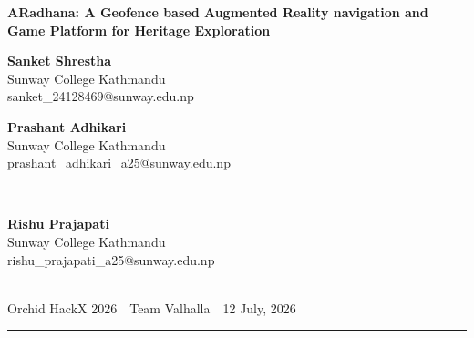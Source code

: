 \documentclass[11pt,a4paper]{report}
\newcommand{\projectname}{ARadhana}
\begin{document}
\thispagestyle{plain} %
\begin{center}
  {\sffamily\LARGE\bfseries\color{orchidnavy}%
    \projectname: A Geofence based Augmented Reality navigation
    and Game Platform for Heritage Exploration\par}
  \vspace{10pt}

  \parbox[t]{0.45\textwidth}{\centering
    \textbf{Sanket Shrestha}\\
    {\small Sunway College Kathmandu}\\
    {\small sanket\_24128469@sunway.edu.np}}%
  \parbox[t]{0.45\textwidth}{\centering
    \textbf{Prashant Adhikari}\\
    {\small Sunway College Kathmandu}\\
    {\small prashant\_adhikari\_a25@sunway.edu.np}}\\[10pt]
  \parbox[t]{0.45\textwidth}{\centering
    \textbf{Rishu Prajapati}\\
    {\small Sunway College Kathmandu}\\
    {\small rishu\_prajapati\_a25@sunway.edu.np}}\\[10pt]

  {\small\color{inkmuted}Orchid HackX 2026 \,\textperiodcentered\, Team Valhalla \,\textperiodcentered\, 12 July, 2026}\\[4pt]
  {\color{orchidcrimson}\rule{0.6\textwidth}{0.8pt}}
\end{center}

\vspace{1em}
\end{document}

